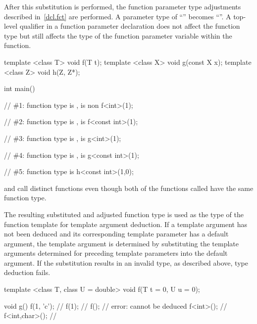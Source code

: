 \pnum
After this substitution is performed, the function parameter type
adjustments described in~\ref{dcl.fct} are performed.
\enterexample
A parameter type of ``'' becomes
``''.
\exitexample
\enternote
A top-level qualifier in a function parameter declaration does not affect
the function type but still affects the type of the function parameter
variable within the function.
\exitnote
\enterexample

\begin{codeblock}
template <class T> void f(T t);
template <class X> void g(const X x);
template <class Z> void h(Z, Z*);

int main() {
  // \#1: function type is ,  is non 
  f<int>(1);

  // \#2: function type is ,  is 
  f<const int>(1);

  // \#3: function type is ,  is 
  g<int>(1);

  // \#4: function type is ,  is 
  g<const int>(1);

  // \#5: function type is 
  h<const int>(1,0);
}
\end{codeblock}
\exitexample

\pnum
\enternote
{} and  call distinct functions
even though both of the functions called have the same function type.
\exitnote

\pnum
The resulting substituted and adjusted function type is used as
the type of the function template for template argument
deduction.  If a template argument has not been deduced and its
corresponding template parameter has a default argument, the
template argument is determined by substituting the template 
arguments determined for preceding template parameters into the
default argument. If the substitution results in an invalid type,
as described above, type deduction fails.
\enterexample
\begin{codeblock}
template <class T, class U = double>
void f(T t = 0, U u = 0);

void g() {
  f(1, 'c');        // 
  f(1);             // 
  f();              // error:  cannot be deduced
  f<int>();         // 
  f<int,char>();    // 
}
\end{codeblock}
\exitexample

